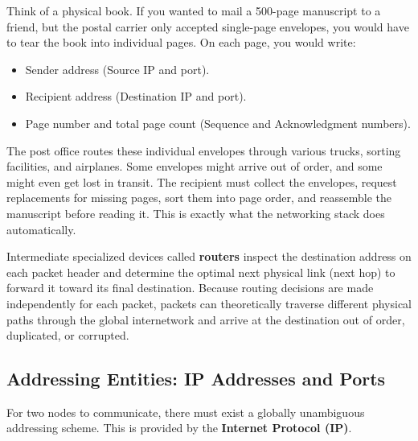 \begin{beginnerconcept}
Think of a physical book. If you wanted to mail a 500-page manuscript to a friend, but the postal carrier only accepted single-page envelopes, you would have to tear the book into individual pages. On each page, you would write:
\begin{itemize}[leftmargin=1.5em]
    \item Sender address (Source IP and port).
    \item Recipient address (Destination IP and port).
    \item Page number and total page count (Sequence and Acknowledgment numbers).
\end{itemize}
The post office routes these individual envelopes through various trucks, sorting facilities, and airplanes. Some envelopes might arrive out of order, and some might even get lost in transit. The recipient must collect the envelopes, request replacements for missing pages, sort them into page order, and reassemble the manuscript before reading it. This is exactly what the networking stack does automatically.
\end{beginnerconcept}

Intermediate specialized devices called \textbf{routers} inspect the destination address on each packet header and determine the optimal next physical link (next hop) to forward it toward its final destination. Because routing decisions are made independently for each packet, packets can theoretically traverse different physical paths through the global internetwork and arrive at the destination out of order, duplicated, or corrupted.

\subsection{Addressing Entities: IP Addresses and Ports}

For two nodes to communicate, there must exist a globally unambiguous addressing scheme. This is provided by the \textbf{Internet Protocol (IP)}.

